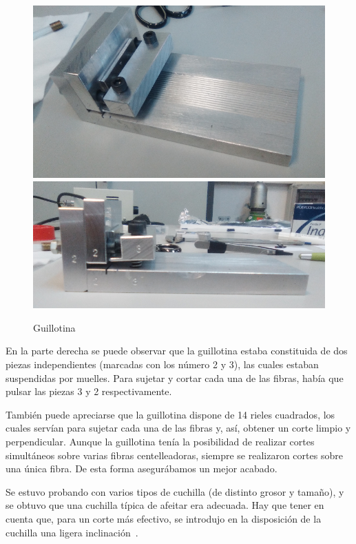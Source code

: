 \begin{figure}[htb]
\centering
{
\includegraphics[scale=0.25]{Guillotina1.png} 
}
{
\includegraphics[scale=0.33]{Guillotina2.png} 
}
\caption{Guillotina\label{Guillotina}}
\end{figure} 

En la parte derecha se puede observar que la guillotina estaba constituida de dos piezas independientes (marcadas con los número 2 y 3), las cuales estaban suspendidas por muelles. Para sujetar y cortar cada una de las fibras, había que pulsar las piezas 3 y 2 respectivamente. 

También puede apreciarse que la guillotina dispone de 14 rieles cuadrados, los cuales servían para sujetar cada una de las fibras y, así, obtener un corte limpio y perpendicular. Aunque la guillotina tenía la posibilidad de realizar cortes simultáneos sobre varias fibras centelleadoras, siempre se realizaron cortes sobre una única fibra. De esta forma asegurábamos un mejor acabado.

Se estuvo probando con varios tipos de cuchilla (de distinto grosor y tamaño),  y se obtuvo que una cuchilla típica de afeitar era adecuada. Hay que tener en cuenta que, para un corte más efectivo, se introdujo en la disposición de la cuchilla una ligera inclinación~\cite{Alberto, anguloytiempo}. 

